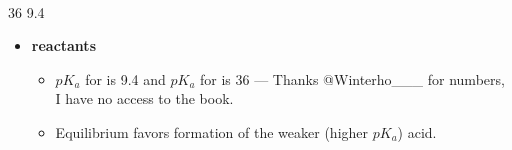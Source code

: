 \documentclass[12pt,a4paper]{article}
\begin{document}
\begin{enumerate}
{    \\
    \hspace{1pt} 36 \hspace{66pt} 9.4
    }
        \begin{itemize}
            \item {\color{o-Sun}\textbf{reactants}}
                \begin{itemize}
                    \item \(pK_a\) for  is 9.4 and \(pK_a\) for  is 36 --- Thanks @Winterho\_\_\_ for numbers, I have no access to the book.
                    \item Equilibrium {\color{o-Sun}favors formation} of the {\color{o-Sun} weaker} (higher \(pK_a\)) {\color{o-Sun}acid}.
                \end{itemize}
        \end{itemize}
\end{enumerate}


\newpage
{}
\end{document}
